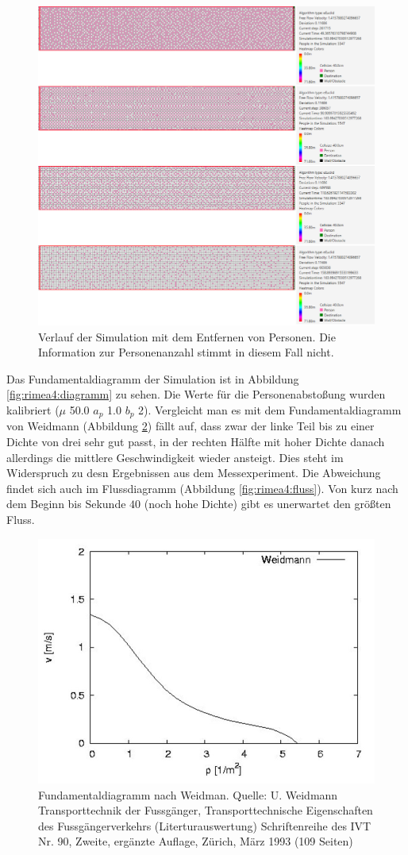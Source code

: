 \begin{figure}
	\centering
	\includegraphics[width=0.7\linewidth]{abbildungen/fundamentaldiagramm/verlauf}
	\caption{Verlauf der Simulation mit dem Entfernen von Personen. Die Information zur Personenanzahl stimmt in diesem Fall nicht.}
	\label{fig:rimea4:verlauf}
\end{figure}

Das Fundamentaldiagramm der Simulation ist in Abbildung \ref{fig:rimea4:diagramm} zu sehen. Die Werte für die Personenabstoßung wurden kalibriert ($\mu$ 50.0 $a_p$ 1.0 $b_p$ 2). Vergleicht man es mit dem Fundamentaldiagramm von Weidmann (Abbildung \ref{fig:rimea4:weidman}) fällt auf, dass zwar der linke Teil bis zu einer Dichte von drei sehr gut passt, in der rechten Hälfte mit hoher Dichte danach allerdings die mittlere Geschwindigkeit wieder ansteigt. Dies steht im Widerspruch zu desn Ergebnissen aus dem Messexperiment. Die Abweichung findet sich auch im Flussdiagramm (Abbildung \ref{fig:rimea4:fluss}). Von kurz nach dem Beginn bis Sekunde $40$ (noch hohe Dichte) gibt es unerwartet den größten Fluss.

\begin{figure}
	\centering
	\includegraphics[width=0.7\linewidth]{abbildungen/fundamentaldiagramm/weidman}
	\caption{Fundamentaldiagramm nach Weidman. Quelle: U. Weidmann Transporttechnik der Fussgänger, Transporttechnische Eigenschaften des Fussgängerverkehrs (Literturauswertung) Schriftenreihe des IVT Nr. 90, Zweite, ergänzte Auflage, Zürich, März 1993 (109 Seiten)}
	\label{fig:rimea4:weidman}
\end{figure}

